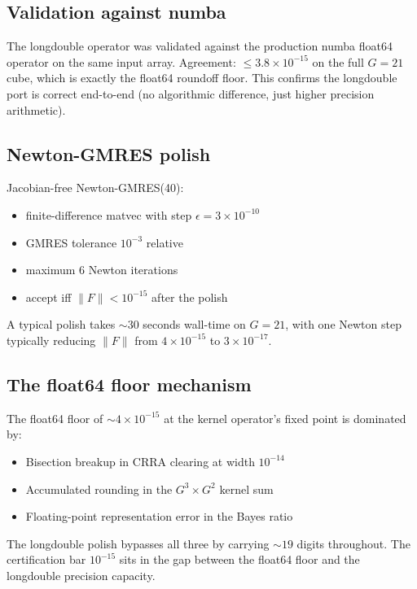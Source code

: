\documentclass[11pt]{article}
\newcommand{\1}{\mathbf{1}}
\begin{document}
\subsection{Validation against numba}

The longdouble operator was validated against the production numba
float64 operator on the same input array.  Agreement: $\le 3.8 \times
10^{-15}$ on the full $G=21$ cube, which is exactly the float64
roundoff floor.  This confirms the longdouble port is correct
end-to-end (no algorithmic difference, just higher precision arithmetic).

\subsection{Newton-GMRES polish}

Jacobian-free Newton-GMRES(40):
\begin{itemize}
\item finite-difference matvec with step $\epsilon = 3 \times 10^{-10}$
\item GMRES tolerance $10^{-3}$ relative
\item maximum 6 Newton iterations
\item accept iff $\|F\| < 10^{-15}$ after the polish
\end{itemize}

A typical polish takes $\sim 30$ seconds wall-time on $G=21$, with one
Newton step typically reducing $\|F\|$ from $4 \times 10^{-15}$ to
$3 \times 10^{-17}$.

\subsection{The float64 floor mechanism}

The float64 floor of $\sim 4 \times 10^{-15}$ at the kernel operator's
fixed point is dominated by:
\begin{itemize}
\item Bisection breakup in CRRA clearing at width $10^{-14}$
\item Accumulated rounding in the $G^3 \times G^2$ kernel sum
\item Floating-point representation error in the Bayes ratio
\end{itemize}

The longdouble polish bypasses all three by carrying $\sim 19$ digits
throughout.  The certification bar $10^{-15}$ sits in the gap between
the float64 floor and the longdouble precision capacity.
\end{document}
